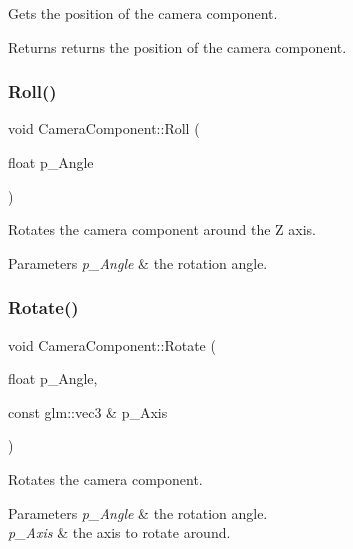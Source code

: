 Gets the position of the camera component. 

\begin{DoxyReturn}{Returns}
returns the position of the camera component. 
\end{DoxyReturn}
\mbox{\label{class_camera_component_acac54caedcd622f9c7e0b032ff6d3ec5}} 
\subsubsection{\texorpdfstring{Roll()}{Roll()}}
{\footnotesize\ttfamily void Camera\+Component\+::\+Roll (\begin{DoxyParamCaption}\item[{float}]{p\+\_\+\+Angle }\end{DoxyParamCaption})\hspace{0.3cm}{\ttfamily [inline]}}



Rotates the camera component around the Z axis. 


\begin{DoxyParams}{Parameters}
{\em p\+\_\+\+Angle} & the rotation angle. \\
\hline
\end{DoxyParams}
\mbox{\label{class_camera_component_a58318ce1f0b1fa97da82d4304beb4005}} 
\subsubsection{\texorpdfstring{Rotate()}{Rotate()}\hspace{0.1cm}{\footnotesize\ttfamily [1/2]}}
{\footnotesize\ttfamily void Camera\+Component\+::\+Rotate (\begin{DoxyParamCaption}\item[{float}]{p\+\_\+\+Angle,  }\item[{const glm\+::vec3 \&}]{p\+\_\+\+Axis }\end{DoxyParamCaption})\hspace{0.3cm}{\ttfamily [inline]}}



Rotates the camera component. 


\begin{DoxyParams}{Parameters}
{\em p\+\_\+\+Angle} & the rotation angle. \\
\hline
{\em p\+\_\+\+Axis} & the axis to rotate around. \\
\hline
\end{DoxyParams}
\mbox{\label{class_camera_component_ad7e109b916a367c044179997b888635b}} 
